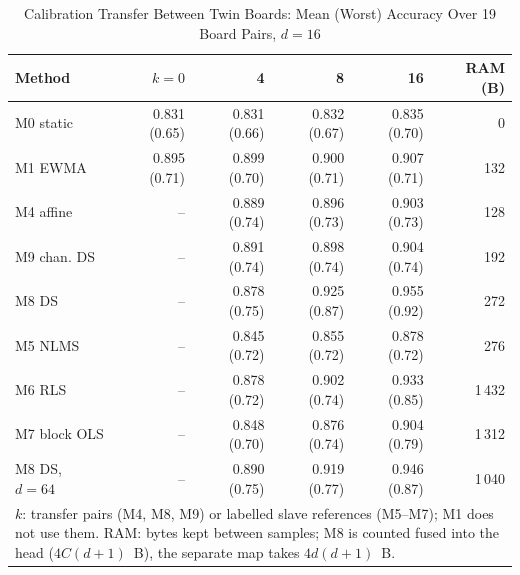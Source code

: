 \begin{table}[t]
\caption{Calibration Transfer Between Twin Boards: Mean (Worst) Accuracy Over 19 Board Pairs, $d=16$}
\label{tab:e4}\centering\scriptsize\setlength{\tabcolsep}{2pt}
\begin{tabular}{l rrrr r}\toprule
Method & $k=0$ & 4 & 8 & 16 & RAM (B)\\\midrule
M0 static & 0.831 (0.65) & 0.831 (0.66) & 0.832 (0.67) & 0.835 (0.70) & 0\\
M1 EWMA & 0.895 (0.71) & 0.899 (0.70) & 0.900 (0.71) & 0.907 (0.71) & 132\\
M4 affine & -- & 0.889 (0.74) & 0.896 (0.73) & 0.903 (0.73) & 128\\
M9 chan. DS & -- & 0.891 (0.74) & 0.898 (0.74) & 0.904 (0.74) & 192\\
M8 DS & -- & 0.878 (0.75) & 0.925 (0.87) & 0.955 (0.92) & 272\\
M5 NLMS & -- & 0.845 (0.72) & 0.855 (0.72) & 0.878 (0.72) & 276\\
M6 RLS & -- & 0.878 (0.72) & 0.902 (0.74) & 0.933 (0.85) & 1\,432\\
M7 block OLS & -- & 0.848 (0.70) & 0.876 (0.74) & 0.904 (0.79) & 1\,312\\
\midrule
M8 DS, $d=64$ & -- & 0.890 (0.75) & 0.919 (0.77) & 0.946 (0.87) & 1\,040\\
\bottomrule
\multicolumn{6}{p{0.95\columnwidth}}{\scriptsize $k$: transfer pairs (M4, M8, M9) or labelled slave references (M5--M7); M1 does not use them. RAM: bytes kept between samples; M8 is counted fused into the head ($4C(d+1)$~B), the separate map takes $4d(d+1)$~B.}
\end{tabular}
\end{table}
